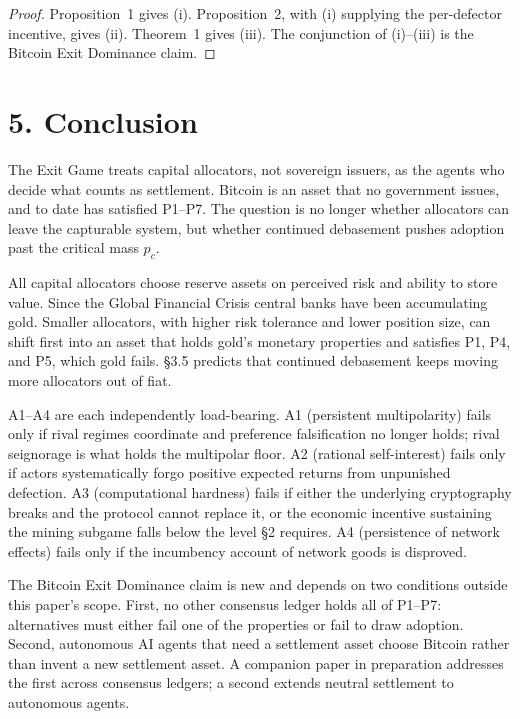 \documentclass[12pt]{article}
\theoremstyle{definition}
\theoremstyle{remark}
\begin{document}
\begin{proof}
Proposition~1 gives (i). Proposition~2, with (i) supplying the
per-defector incentive, gives (ii). Theorem~1 gives (iii). The
conjunction of (i)--(iii) is the Bitcoin Exit Dominance claim.
\end{proof}



\section{5. Conclusion}

The Exit Game treats capital allocators, not sovereign issuers, as the agents who decide what counts as settlement. Bitcoin is an asset that no government issues, and to date has satisfied P1--P7. The question is no longer whether allocators can leave the capturable system, but whether continued debasement pushes adoption past the critical mass $p_c$.

All capital allocators choose reserve assets on perceived risk and ability to store value. Since the Global Financial Crisis central banks have been accumulating gold. Smaller allocators, with higher risk tolerance and lower position size, can shift first into an asset that holds gold's monetary properties and satisfies P1, P4, and P5, which gold fails. \S3.5 predicts that continued debasement keeps moving more allocators out of fiat.

A1--A4 are each independently load-bearing. A1 (persistent multipolarity) fails only if rival regimes coordinate and preference falsification no longer holds; rival seignorage is what holds the multipolar floor. A2 (rational self-interest) fails only if actors systematically forgo positive expected returns from unpunished defection. A3 (computational hardness) fails if either the underlying cryptography breaks and the protocol cannot replace it, or the economic incentive sustaining the mining subgame falls below the level §2 requires. A4 (persistence of network effects) fails only if the incumbency account of network goods is disproved.

The Bitcoin Exit Dominance claim is new and depends on two conditions outside this paper's scope. First, no other consensus ledger holds all of P1--P7: alternatives must either fail one of the properties or fail to draw adoption. Second, autonomous AI agents that need a settlement asset choose Bitcoin rather than invent a new settlement asset. A companion paper in preparation addresses the first across consensus ledgers; a second extends neutral settlement to autonomous agents.
\end{document}
